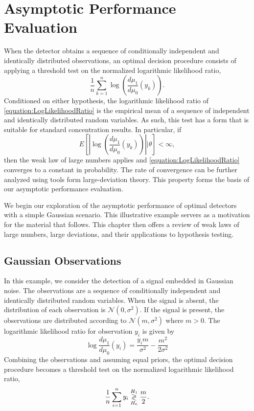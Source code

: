 
\section{Asymptotic Performance Evaluation}

When the detector obtains a sequence of conditionally independent and identically distributed observations, an optimal decision procedure consists of applying a threshold test on the normalized logarithmic likelihood ratio,
\begin{equation} \label{equation:LogLikelihoodRatio}
\frac{1}{n} \sum_{k=1}^n \log \left( \frac{d\mu_1}{d\mu_0}(y_k) \right) .
\end{equation}
Conditioned on either hypothesis, the logarithmic likelihood ratio of \eqref{equation:LogLikelihoodRatio} is the empirical mean of a sequence of independent and identically distributed random variables.
As such, this test has a form that is suitable for standard concentration results.
In particular, if
\begin{equation*}
E \left[ \left| \log \left( \frac{d\mu_1}{d\mu_0}(y_k) \right) \right| \Big| \theta \right] < \infty ,
\end{equation*}
then the weak law of large numbers applies and \eqref{equation:LogLikelihoodRatio} converges to a constant in probability.
The rate of convergence can be further analyzed using tools form large-deviation theory.
This property forms the basis of our asymptotic performance evaluation.

We begin our exploration of the asymptotic performance of optimal detectors with a simple Gaussian scenario.
This illustrative example servers as a motivation for the material that follows.
This chapter then offers a review of weak laws of large numbers, large deviations, and their applications to hypothesis testing.


\subsection{Gaussian Observations}

In this example, we consider the detection of a signal embedded in Gaussian noise.
The observations are a sequence of conditionally independent and identically distributed random variables.
When the signal is absent, the distribution of each observation is $\mathcal{N}(0,\sigma^2)$.
If the signal is present, the observations are distributed according to $\mathcal{N}(m,\sigma^2)$ where $m > 0$.
The logarithmic likelihood ratio for observation $y_i$ is given by
\begin{equation*}
\log \frac{d\mu_1}{d\mu_0} (y_i) = \frac{y_i m}{\sigma^2} - \frac{m^2}{2 \sigma^2}
\end{equation*}
Combining the observations and assuming equal priors, the optimal decision procedure becomes a threshold test on the normalized logarithmic likelihood ratio,
\begin{equation*}
\frac{1}{n} \sum_{i=1}^n y_i \overset{H_1}{ \underset{H_0}{\gtrless} } \frac{m}{2} .
\end{equation*}

